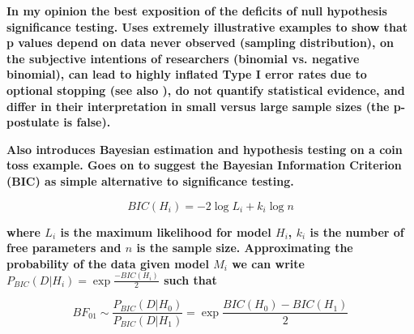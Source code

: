 \documentclass[12pt]{scrartcl}
\begin{document}
\begin{description}
  \item {}
  
  \item {}
   
  \item {}
  
  \item {}
  
  \item {}
  
  \item {}
  
  \item {}
  
  \item {}
    
  \item {}
  
  \textbf{In my opinion the best exposition of the deficits of null hypothesis significance testing. Uses extremely illustrative examples to show that p values depend on data never observed (sampling distribution), on the subjective intentions of researchers (binomial vs. negative binomial), can lead to highly inflated Type I error rates due to optional stopping (see also \cite{simmons2011false}), do not quantify statistical evidence, and differ in their interpretation in small versus large sample sizes (the p-postulate is false).}
  
  \textbf{Also introduces Bayesian estimation and hypothesis testing on a coin toss example. Goes on to suggest the Bayesian Information Criterion (BIC) as simple alternative to significance testing.}
  
  \begin{equation*}
    BIC(H_i) = -2 \log L_i + k_i \log n
  \end{equation*}
  
  \textbf{where $L_i$ is the maximum likelihood for model $H_i$, $k_i$ is the number of free parameters and $n$ is the sample size. Approximating the probability of the data given model $M_i$ we can write $P_{BIC}(D|H_i) = \exp{\frac{-BIC(H_i)}{2}}$ such that}
  
  \begin{equation*}
    BF_{01} \sim \frac{P_{BIC}(D|H_0)}{P_{BIC}(D|H_1)} = \exp{\frac{BIC(H_0) - BIC(H_1)}{2}}
  \end{equation*}
  

\end{description}
\end{document}
